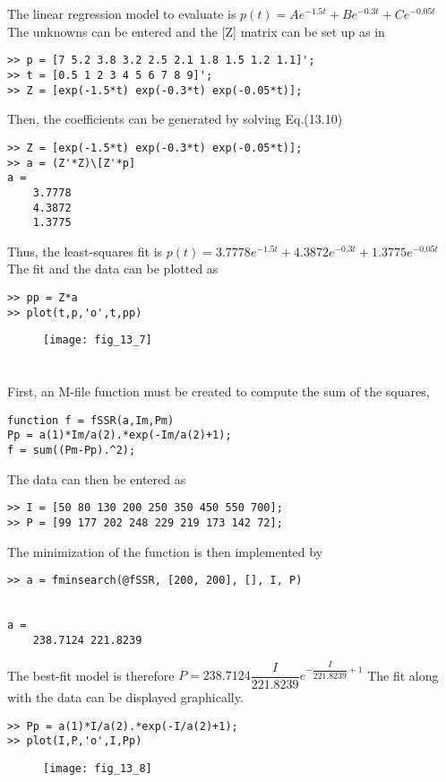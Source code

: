 \documentclass[../main.tex]{subfiles}
\begin{document}
\section{}
The linear regression model to evaluate is
	\bigbreak
$p(t)=A e^{-1.5 t}+B e^{-0.3 t}+C e^{-0.05 t}$
	\bigbreak
The unknowns can be entered and the [Z] matrix can be set up as in
	\bigbreak
\begin{lstlisting}[numbers=none]
>> p = [7 5.2 3.8 3.2 2.5 2.1 1.8 1.5 1.2 1.1]';
>> t = [0.5 1 2 3 4 5 6 7 8 9]';
>> Z = [exp(-1.5*t) exp(-0.3*t) exp(-0.05*t)];
\end{lstlisting}
	\bigbreak
Then, the coefficients can be generated by solving Eq.(13.10)
	\bigbreak
\begin{lstlisting}[numbers=none]
>> Z = [exp(-1.5*t) exp(-0.3*t) exp(-0.05*t)];
>> a = (Z'*Z)\[Z'*p]
a =
	3.7778
	4.3872
	1.3775 
\end{lstlisting}
	\bigbreak
Thus, the least-squares fit is
	\bigbreak
$p(t)=3.7778 e^{-1.5 t}+4.3872 e^{-0.3 t}+1.3775 e^{-0.05 t}$
	\bigbreak
The fit and the data can be plotted as
\begin{lstlisting}[numbers=none]
>> pp = Z*a
>> plot(t,p,'o',t,pp)
\end{lstlisting}
	\bigbreak
	\begin{figure}[H]
		\texttt{[image: fig\_13\_7]}
		\label{fig:fig_13_7}
	\end{figure}
	\bigbreak



\section{}
First, an M-file function must be created to compute the sum of the squares,
\begin{lstlisting}[numbers=none]
function f = fSSR(a,Im,Pm)
Pp = a(1)*Im/a(2).*exp(-Im/a(2)+1);
f = sum((Pm-Pp).^2); 
\end{lstlisting}
	\bigbreak
The data can then be entered as
	\bigbreak
\begin{lstlisting}[numbers=none]
>> I = [50 80 130 200 250 350 450 550 700];
>> P = [99 177 202 248 229 219 173 142 72]; 
\end{lstlisting}
	\bigbreak
The minimization of the function is then implemented by 
	\bigbreak
\begin{lstlisting}[numbers=none]
>> a = fminsearch(@fSSR, [200, 200], [], I, P)


a =
	238.7124 221.8239
\end{lstlisting}
	\bigbreak
The best-fit model is therefore
	\bigbreak
$P=238.7124 \dfrac{I}{221.8239} e^{-\dfrac{I}{221.8239}+1}$
	\bigbreak
The fit along with the data can be displayed graphically.
	\bigbreak
\begin{lstlisting}[numbers=none]
>> Pp = a(1)*I/a(2).*exp(-I/a(2)+1);
>> plot(I,P,'o',I,Pp) 
\end{lstlisting}
	\bigbreak
	\begin{figure}[H]
		\texttt{[image: fig\_13\_8]}
		\label{fig:fig_13_8}
	\end{figure}
	\bigbreak
\end{document}

